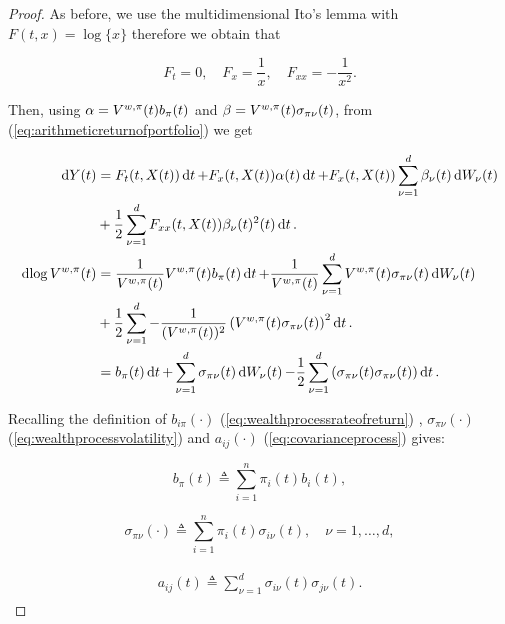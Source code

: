 \documentclass[british]{amsart} \usepackage{lmodern}
\numberwithin{equation}{section} \numberwithin{figure}{section}
\theoremstyle{plain} \newtheorem{thm}{\protect\theoremname}[section]
\theoremstyle{definition} \newtheorem{defn}[thm]{\protect\definitionname}
\theoremstyle{plain} \newtheorem{assumption}[thm]{\protect\assumptionname}
\theoremstyle{plain} \newtheorem{lem}[thm]{\protect\lemmaname}
\theoremstyle{plain} \newtheorem{prop}[thm]{\protect\propositionname}
\theoremstyle{remark} \newtheorem{rem}[thm]{\protect\remarkname}
\theoremstyle{plain} \newtheorem{cor}[thm]{\protect\corollaryname}
\renewcommand{\d}[1]{\mathop{\mathrm{d}{#1}}}
\newcommand{\defeq}{\mathop{\triangleq}} \newcommand{\almostsurely}{\text{a.s.}}
\newcommand{\V}{V^{w,\pi}}
\begin{document}
\begin{proof}

  As before, we use the multidimensional Ito's lemma with $F(t,x)=\log\{x\}$ therefore we obtain that

  \begin{equation}
    F_{t}=0, \quad F_{x}=\frac{1}{x}, \quad F_{xx}=-\frac{1}{x^2}.
  \end{equation}

  Then, using $\alpha=\Valpha$ and $\beta=\Vbeta$, from (\ref{eq:arithmeticreturnofportfolio}) we get

  \begin{gather*}
    \begin{split}
      \d{Y(t)} &= F_{t}(t, X(t))\d{t} + F_{x}(t,X(t)) \alpha(t)\d{t} 
         + F_{x}(t,X(t)) \sum_{\nu=1}^d \beta_{\nu}(t)\d{W_{\nu}(t)} \\
         &+ \frac{1}{2} \sum_{\nu=1}^d F_{xx}(t,X(t)) \beta_{\nu}(t)^{2}(t)\d{t}. \\
     \d{\log{\V(t)}} 
         &= \VFx \Valpha \d{t} + \VFx \sum_{\nu=1}^d \Vbeta \d{W_{\nu}(t)} \\
            &+ \frac{1}{2} \sum_{\nu=1}^d \VFxx \left( \Vbeta \right)^{2} \d{t}. \\
         &= b_{\pi}(t) \d{t} 
            + \sum_{\nu=1}^d \sigma_{\pi\nu}(t)  \d{W_{\nu}(t)} 
            - \frac{1}{2} \sum_{\nu=1}^d \left( \sigma_{\pi\nu}(t)\sigma_{\pi\nu}(t) \right) \d{t}. \\
    \end{split}
  \end{gather*}

  Recalling the definition of $b_{i\pi}(\cdot)$ (\ref{eq:wealthprocessrateofreturn})
  , $\sigma_{\pi\nu}(\cdot)$ (\ref{eq:wealthprocessvolatility}) and
  $a_{ij}(\cdot)$ (\ref{eq:covarianceprocess}) gives:

  \begin{equation*}
    b_{\pi}(t) \defeq \sum_{i=1}^{n} \pi_{i}(t) b_{i}(t),
  \end{equation*}

  \begin{equation*}
    \sigma_{\pi\nu}(\cdot) \defeq \sum_{i=1}^{n} \pi_{i}(t) \sigma_{i\nu}(t),
    \quad \nu=1,\dots,d,
  \end{equation*}

  \begin{gather*}
    \begin{split}
      a_{ij}(t) \defeq \sum_{\nu=1}^{d}\sigma_{i\nu}(t)\sigma_{j\nu}(t).
    \end{split}
  \end{gather*}


\end{proof}
\end{document}
